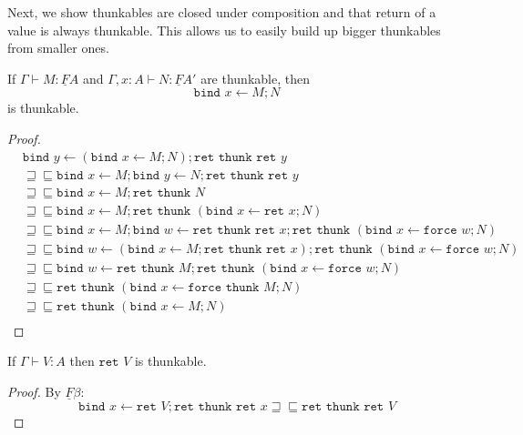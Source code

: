 \documentclass[acmsmall,screen,12pt]{acmart}
\renewcommand{\u}{\underline}
\newcommand{\ltdyn}{\sqsubseteq}
\newcommand{\gtdyn}{\sqsupseteq}
\newcommand{\equidyn}{\mathrel{\gtdyn\ltdyn}}
\newcommand{\bindXtoYinZ}[2]{\kw{bind}#2 \leftarrow #1;}
\newcommand{\kw}[1]{\texttt{#1}\,\,}
\newcommand{\ret}{\kw{ret}}
\newcommand{\thunk}{\kw{thunk}}
\newcommand{\force}{\kw{force}}
\begin{document}
{\begin{longonly}
Next, we show thunkables are closed under composition and that return
of a value is always thunkable.  This allows us to easily build up
bigger thunkables from smaller ones.
\begin{lemma}
  If $\Gamma \vdash M : \u F A$ and $\Gamma, x : A \vdash N : \u F A'$
  are thunkable, then
  \[ \bindXtoYinZ M x N \]
  is thunkable.
\end{lemma}
\begin{proof}
  \begin{align*}
    &\bindXtoYinZ {(\bindXtoYinZ M x N)} y \ret\thunk\ret y\\
    &\equidyn \bindXtoYinZ M x \bindXtoYinZ N y \ret\thunk\ret y\tag{$\u F\eta$}\\
    &\equidyn \bindXtoYinZ M x \ret \thunk N \tag{$N$ thunkable}\\
    &\equidyn \bindXtoYinZ M x \ret \thunk (\bindXtoYinZ {\ret x} x N)\tag{$\u F\beta$}\\
    &\equidyn \bindXtoYinZ M x \bindXtoYinZ {\ret\thunk\ret x} w \ret \thunk (\bindXtoYinZ {\force w} x N)\tag{$\u F\beta,U\beta$}\\
    &\equidyn \bindXtoYinZ {(\bindXtoYinZ M x \ret\thunk\ret x)} w \ret \thunk (\bindXtoYinZ {\force w} x N)\tag{$\u F\eta$}\\
    &\equidyn \bindXtoYinZ {\ret\thunk M} w \ret \thunk (\bindXtoYinZ {\force w} x N)\tag{$M$ thunkable}\\
    &\equidyn  \ret \thunk (\bindXtoYinZ {\force \thunk M} x N)\tag{$\u F\beta$}\\
    &\equidyn  \ret \thunk (\bindXtoYinZ {M} x N)\tag{$U\beta$}\\
  \end{align*}
\end{proof}

\begin{lemma}
  If $\Gamma \vdash V : A$ then $\ret V$ is thunkable.
\end{lemma}
\begin{proof}
  By $\u F\beta$:
  \[ \bindXtoYinZ {\ret V} x \ret\thunk\ret x \equidyn \ret\thunk\ret V \]
\end{proof}


\end{longonly}}
\end{document}
